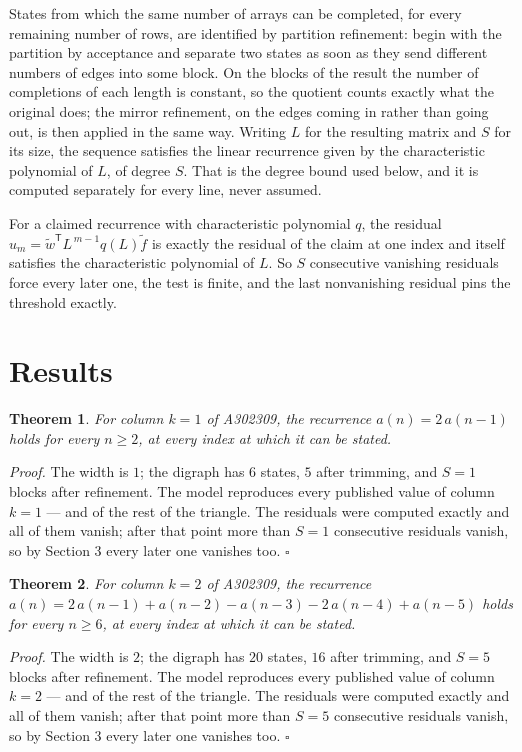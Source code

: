 \documentclass[11pt]{article}
\newtheorem{theorem}{Theorem}
\theoremstyle{definition}
\begin{document}
States from which the same number of arrays can be completed, for every remaining number of rows, are identified by partition refinement: begin with the partition by acceptance and separate two states as soon as they send different numbers of edges into some block. On the blocks of the result the number of completions of each length is constant, so the quotient counts exactly what the original does; the mirror refinement, on the edges coming in rather than going out, is then applied in the same way. Writing $L$ for the resulting matrix and $S$ for its size, the sequence satisfies the linear recurrence given by the characteristic polynomial of $L$, of degree $S$. That is the degree bound used below, and it is computed separately for every line, never assumed.

For a claimed recurrence with characteristic polynomial $q$, the residual $u_m = \tilde w^{\mathsf T}L^{\,m-1}q(L)\tilde f$ is exactly the residual of the claim at one index and itself satisfies the characteristic polynomial of $L$. So $S$ consecutive vanishing residuals force every later one, the test is finite, and the last nonvanishing residual pins the threshold exactly.

\section{Results}

\begin{theorem} For column $k = 1$ of A302309, the recurrence $a(n) = 2\,a(n-1)$ holds for every $n \ge 2$, at every index at which it can be stated.\end{theorem}

{\itshape Proof.} The width is $1$; the digraph has $6$ states, $5$ after trimming, and $S = 1$ blocks after refinement. The model reproduces every published value of column $k = 1$ --- and of the rest of the triangle. The residuals were computed exactly and all of them vanish; after that point more than $S = 1$ consecutive residuals vanish, so by Section 3 every later one vanishes too. $\square$

\begin{theorem} For column $k = 2$ of A302309, the recurrence $a(n) = 2\,a(n-1) + a(n-2) - a(n-3) - 2\,a(n-4) + a(n-5)$ holds for every $n \ge 6$, at every index at which it can be stated.\end{theorem}

{\itshape Proof.} The width is $2$; the digraph has $20$ states, $16$ after trimming, and $S = 5$ blocks after refinement. The model reproduces every published value of column $k = 2$ --- and of the rest of the triangle. The residuals were computed exactly and all of them vanish; after that point more than $S = 5$ consecutive residuals vanish, so by Section 3 every later one vanishes too. $\square$
\end{document}
